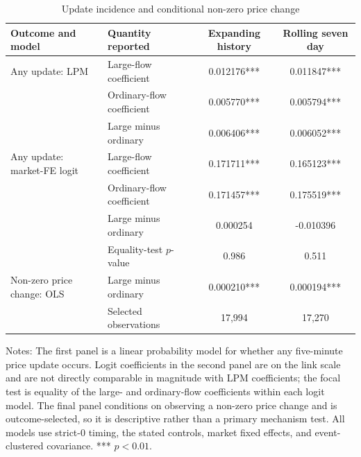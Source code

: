 \begin{table}[htbp]
\centering
\caption{Update incidence and conditional non-zero price change}
\label{tab:v5-mechanism}
\small
\begin{tabular}{llcc}
\toprule
Outcome and model & Quantity reported & Expanding history & Rolling seven day \\
\midrule
Any update: LPM & Large-flow coefficient & 0.012176*** & 0.011847*** \\
 & Ordinary-flow coefficient & 0.005770*** & 0.005794*** \\
 & Large minus ordinary & 0.006406*** & 0.006052*** \\
\addlinespace
Any update: market-FE logit & Large-flow coefficient & 0.171711*** & 0.165123*** \\
 & Ordinary-flow coefficient & 0.171457*** & 0.175519*** \\
 & Large minus ordinary & 0.000254 & -0.010396 \\
 & Equality-test $p$-value & 0.986 & 0.511 \\
\addlinespace
Non-zero price change: OLS & Large minus ordinary & 0.000210*** & 0.000194*** \\
 & Selected observations & 17,994 & 17,270 \\
\bottomrule
\end{tabular}
\par\vspace{3pt}
\begin{minipage}{0.96\textwidth}
\footnotesize Notes: The first panel is a linear probability model for whether
any five-minute price update occurs. Logit coefficients in the second panel are
on the link scale and are not directly comparable in magnitude with LPM
coefficients; the focal test is equality of the large- and ordinary-flow
coefficients within each logit model. The final panel conditions on observing a
non-zero price change and is outcome-selected, so it is descriptive rather than
a primary mechanism test. All models use strict-0 timing, the stated controls,
market fixed effects, and event-clustered covariance. *** $p<0.01$.
\end{minipage}
\end{table}
